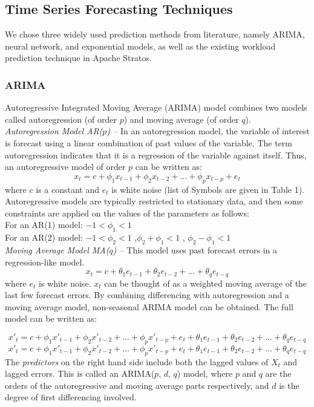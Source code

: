 \subsection{Time Series Forecasting Techniques}
We chose three widely used prediction methods from literature, namely ARIMA, neural network, and exponential models, as well as the existing workload prediction technique in Apache Stratos.

\subsubsection{ARIMA}
Autoregressive Integrated Moving Average (ARIMA) model combines two models called autoregression (of order $p$) and moving average (of order $q$).\\

\noindent
\textit{Autoregression Model AR($p$) --}
In an autoregression model, the variable of interest is forecast using a linear combination of past values of the variable. The term autoregression indicates that it is a regression of the variable against itself. Thus, an autoregressive model of order $p$ can be written as:
	$$x_t = c + \phi_1x_{ t-1} + \phi_2x_{t-2} +...+ \phi_px_{t-p} + e_{t}$$
where $c$ is a constant and $e_t$ is white noise (list of Symbols are given in Table 1). Autoregressive models are typically restricted to stationary data, and then some constraints are applied on the values of the parameters \cite{Forecasting_OTexts} as follows: \\
    For an AR(1) model: $-1 < \phi_{1} < 1$ \\
    For an AR(2) model: $-1 < \phi_{2} < 1$ ,$\phi_{2}+ \phi_{1} < 1$ , $\phi_{2} - \phi_{1} < 1$ \\

\noindent
\textit{Moving Average Model MA($q$) --}
This model uses past forecast errors in a regression-like model.
	$$x_t = c + \theta_1e_{ t-1} + \theta_2e_{t-2} +...+ \theta_qe_{t-q}$$
where $e_t$ is white noise. $x_t$ can be thought of as a weighted moving average of the last few forecast errors. 
By combining differencing with autoregression and a moving average model, non-seasonal ARIMA model can be obtained. The full model can be written as:

	$${x}'_t = c + \phi_1{x}'_{ t-1} + \phi_2{x}'_{t-2} +...+ \phi_p{x}'_{t-p} + e_{t} + \theta_1e_{ t-1} + \theta_2e_{t-2} +...+ \theta_qe_{t-q}$$
	$${x}'_t = c + \phi_1{x}'_{ t-1} + \phi_2{x}'_{t-2} +...+ \phi_p{x}'_{t-p} + e_{t} + \theta_1e_{ t-1} + \theta_2e_{t-2} +...+ \theta_qe_{t-q}$$
The \textit{predictors} on the right hand side include both the lagged values of $X_t$ and lagged errors. This is called an ARIMA($p$, $d$, $q$) model, where $p$ and $q$ are the orders of the autoregressive and moving average parts respectively, and $d$ is the degree of first differencing involved.

